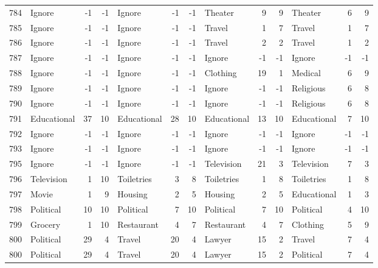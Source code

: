 \begin{figure}[htbp]
\begin{tabular}{rlrrlrrlrrlrr}
    784   & Ignore & -1    & -1    & Ignore & -1    & -1    & Theater & 9     & 9     & Theater & 6     & 9 \\
    785   & Ignore & -1    & -1    & Ignore & -1    & -1    & Travel & 1     & 7     & Travel & 1     & 7 \\
    786   & Ignore & -1    & -1    & Ignore & -1    & -1    & Travel & 2     & 2     & Travel & 1     & 2 \\
    787   & Ignore & -1    & -1    & Ignore & -1    & -1    & Ignore & -1    & -1    & Ignore & -1    & -1 \\
    788   & Ignore & -1    & -1    & Ignore & -1    & -1    & Clothing & 19    & 1     & Medical & 6     & 9 \\
    789   & Ignore & -1    & -1    & Ignore & -1    & -1    & Ignore & -1    & -1    & Religious & 6     & 8 \\
    790   & Ignore & -1    & -1    & Ignore & -1    & -1    & Ignore & -1    & -1    & Religious & 6     & 8 \\
    791   & Educational & 37    & 10    & Educational & 28    & 10    & Educational & 13    & 10    & Educational & 7     & 10 \\
    792   & Ignore & -1    & -1    & Ignore & -1    & -1    & Ignore & -1    & -1    & Ignore & -1    & -1 \\
    793   & Ignore & -1    & -1    & Ignore & -1    & -1    & Ignore & -1    & -1    & Ignore & -1    & -1 \\
    795   & Ignore & -1    & -1    & Ignore & -1    & -1    & Television & 21    & 3     & Television & 7     & 3 \\
    796   & Television & 1     & 10    & Toiletries & 3     & 8     & Toiletries & 1     & 8     & Toiletries & 1     & 8 \\
    797   & Movie & 1     & 9     & Housing & 2     & 5     & Housing & 2     & 5     & Educational & 1     & 3 \\
    798   & Political & 10    & 10    & Political & 7     & 10    & Political & 7     & 10    & Political & 4     & 10 \\
    799   & Grocery & 1     & 10    & Restaurant & 4     & 7     & Restaurant & 4     & 7     & Clothing & 5     & 9 \\
    800   & Political & 29    & 4     & Travel & 20    & 4     & Lawyer & 15    & 2     & Travel & 7     & 4 \\
    800   & Political & 29    & 4     & Travel & 20    & 4     & Lawyer & 15    & 2     & Political & 7     & 4 \\

\end{tabular}
\end{figure}
